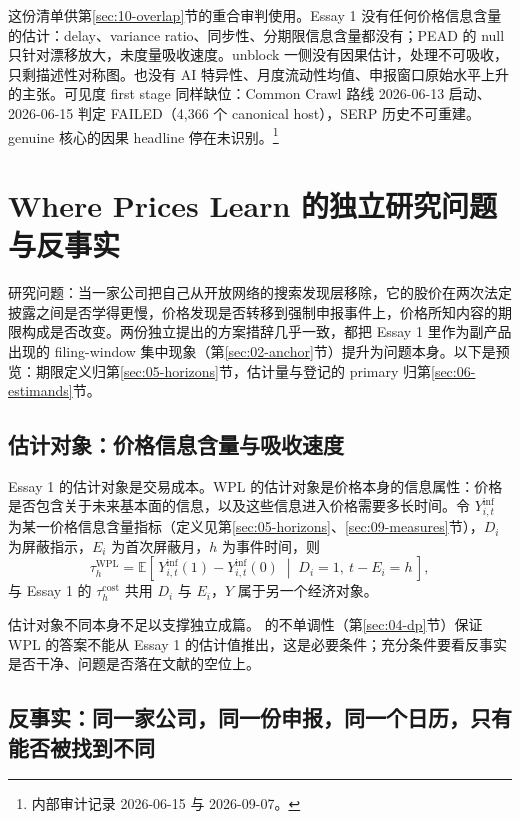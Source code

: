 \documentclass[a4paper,11pt]{ctexart}
\begin{document}
这份清单供第\ref{sec:10-overlap}节的重合审判使用。Essay 1 没有任何价格信息含量的估计：delay、variance ratio、同步性、分期限信息含量都没有；PEAD 的 null 只针对漂移放大，未度量吸收速度。unblock 一侧没有因果估计，处理不可吸收，只剩描述性对称图。也没有 AI 特异性、月度流动性均值、申报窗口原始水平上升的主张。可见度 first stage 同样缺位：Common Crawl 路线 2026-06-13 启动、2026-06-15 判定 FAILED（4,366 个 canonical host），SERP 历史不可重建。genuine 核心的因果 headline 停在未识别。\footnote{内部审计记录 2026-06-15 与 2026-09-07。}
\clearpage

\section{Where Prices Learn 的独立研究问题与反事实}\label{sec:03-rq}

研究问题：当一家公司把自己从开放网络的搜索发现层移除，它的股价在两次法定披露之间是否学得更慢，价格发现是否转移到强制申报事件上，价格所知内容的期限构成是否改变。两份独立提出的方案措辞几乎一致，都把 Essay 1 里作为副产品出现的 filing-window 集中现象（第\ref{sec:02-anchor}节）提升为问题本身。以下是预览：期限定义归第\ref{sec:05-horizons}节，估计量与登记的 primary 归第\ref{sec:06-estimands}节。

\subsection{估计对象：价格信息含量与吸收速度}\label{sec:03-estimand}

Essay 1 的估计对象是交易成本。WPL 的估计对象是价格本身的信息属性：价格是否包含关于未来基本面的信息，以及这些信息进入价格需要多长时间。令 $Y^{\mathrm{inf}}_{i,t}$ 为某一价格信息含量指标（定义见第\ref{sec:05-horizons}、\ref{sec:09-measures}节），$D_{i}$ 为屏蔽指示，$E_i$ 为首次屏蔽月，$h$ 为事件时间，则
\begin{equation}\label{eq:03-estimand}
\tau^{\mathrm{WPL}}_{h}
= \mathbb{E}\!\left[\,Y^{\mathrm{inf}}_{i,t}(1)-Y^{\mathrm{inf}}_{i,t}(0)\;\middle|\;D_i=1,\ t-E_i=h\,\right],
\end{equation}
与 Essay 1 的 $\tau^{\mathrm{cost}}_h$ 共用 $D_i$ 与 $E_i$，$Y$ 属于另一个经济对象。

估计对象不同本身不足以支撑独立成篇。\citet{davilaparlatore2021} 的不单调性（第\ref{sec:04-dp}节）保证 WPL 的答案不能从 Essay 1 的估计值推出，这是必要条件；充分条件要看反事实是否干净、问题是否落在文献的空位上。

\subsection{反事实：同一家公司，同一份申报，同一个日历，只有能否被找到不同}\label{sec:03-cf}
\end{document}
